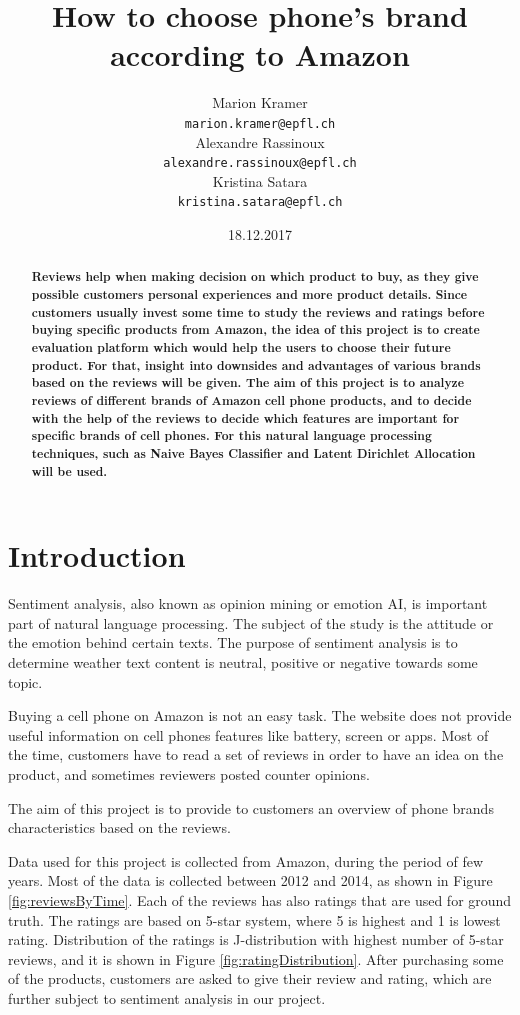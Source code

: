 \documentclass[11pt]{article}
\title{How to choose phone's brand according to Amazon}
\author{Marion Kramer\\
    {\tt marion.kramer@epfl.ch} \\\And
    Alexandre Rassinoux \\
    {\tt alexandre.rassinoux@epfl.ch} \\\And
  Kristina Satara \\
  {\tt kristina.satara@epfl.ch} \\}
\date{18.12.2017}
\begin{document}
  \maketitle
  \begin{abstract}
  \textbf {Reviews help when making decision on which product to buy, as they give possible customers personal experiences and more product details. Since customers usually invest some time to study the reviews and ratings before buying specific products from Amazon, the idea of this project is to create evaluation platform which would help the users to choose their future product. For that, insight into  downsides and advantages of various brands based on the reviews will be given. The aim of this project is to analyze reviews of different brands of Amazon cell phone products, and to decide with the help of the reviews to decide which features are important for specific brands of cell phones. For this natural language processing techniques, such as Naive Bayes Classifier and Latent Dirichlet Allocation will be used.}
  \end{abstract}
  
  
  \section{Introduction}
  Sentiment analysis, also known as opinion mining or emotion AI, is important part of natural language processing. The subject of the study is the attitude or the emotion behind certain texts. The purpose of sentiment analysis is to determine weather text content is neutral, positive or negative towards some topic. 
  
  \par Buying a cell phone on Amazon is not an easy task. The website does not provide useful information on cell phones features like battery, screen or apps. Most of the time, customers have to read a set of reviews in order to have an idea on the product, and sometimes reviewers posted counter opinions. 
  \par The aim of this project is to provide to customers an overview of phone brands characteristics based on the reviews. 
  
  Data used for this project is collected from Amazon, during the period of few years. Most of the data is collected between 2012 and 2014, as shown in Figure \ref{fig:reviewsByTime}. Each of the reviews has also ratings that are used for ground truth. The ratings are based on 5-star system, where 5 is highest and 1 is lowest rating. Distribution of the ratings is J-distribution with highest number of 5-star reviews, and it is shown in Figure \ref{fig:ratingDistribution}. After purchasing some of the products, customers are asked to give their review and rating, which are further subject to sentiment analysis in our project. 
  
\end{document}
